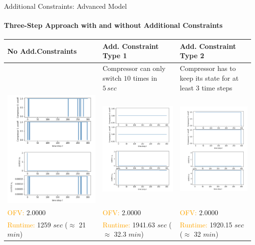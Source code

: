 \documentclass[8pt]{beamer}
\begin{document}
\begin{frame}{Additional Constraints: Advanced Model}
\framesubtitle{Three-Step Approach with and without Additional Constraints}
\begin{tabular}{l p{3cm} p{3cm}} \hline
No Add.Constraints & Add. Constraint Type 1& Add. Constraint Type 2 \\\hline
& Compressor can only switch $10$ times in $5 \, sec $& Compressor has to keep its state for at least $3$ time steps \\
\includegraphics[width=.32\textwidth]{images/AdvancedModel3Step} & \includegraphics[width=.32\textwidth]{images/AdvancedModel3Step2}& \includegraphics[width=.32\textwidth]{images/AdvancedModel3Step3}   \\
\textcolor{orange}{OFV:} $2.0000$ & \textcolor{orange}{OFV:}  $2.0000$ & \textcolor{orange}{OFV:}  $2.0000$ \\ 
\textcolor{orange}{Runtime:} 1259 $sec$ ($\approx$ 21 $min$) & \textcolor{orange}{Runtime:}  1941.63 $sec$ ($\approx$ 32.3 $min$) & \textcolor{orange}{Runtime:}  1920.15 $sec$ ($\approx$ 32 $min$)\\
\end{tabular}
\end{frame}
\end{document}

